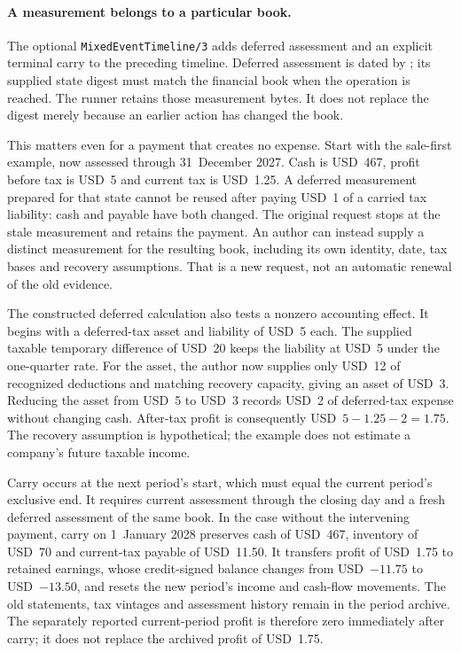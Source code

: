 \paragraph{A measurement belongs to a particular book.}
The optional \texttt{MixedEventTimeline/3} adds deferred assessment and an
explicit terminal carry to the preceding timeline. Deferred assessment is
dated by ; its supplied state digest must match the
financial book when the operation is reached. The runner retains those
measurement bytes. It does not replace the digest merely because an earlier
action has changed the book.

This matters even for a payment that creates no expense. Start with the
sale-first example, now assessed through 31~December 2027. Cash is USD~467,
profit before tax is USD~5 and current tax is USD~1.25. A deferred measurement
prepared for that state cannot be reused after paying USD~1 of a carried tax
liability: cash and payable have both changed. The original request stops at
the stale measurement and retains the payment. An author can instead supply
a distinct measurement for the resulting book, including its own identity,
date, tax bases and recovery assumptions. That is a new request, not an
automatic renewal of the old evidence.

The constructed deferred calculation also tests a nonzero accounting effect.
It begins with a deferred-tax asset and liability of USD~5 each. The supplied
taxable temporary difference of USD~20 keeps the liability at USD~5 under
the one-quarter rate. For the asset, the author now supplies only USD~12 of
recognized deductions and matching recovery capacity, giving an asset of
USD~3. Reducing the asset from USD~5 to USD~3 records USD~2 of deferred-tax
expense without changing cash. After-tax profit is consequently
USD~$5-1.25-2=1.75$. The recovery assumption is hypothetical; the example
does not estimate a company's future taxable income.

Carry occurs at the next period's start, which must equal the current period's
exclusive end. It requires current assessment through the closing day and a
fresh deferred assessment of the same book. In the case without the intervening
payment, carry on 1~January 2028 preserves cash of USD~467, inventory of USD~70
and current-tax payable of USD~11.50. It transfers profit of USD~1.75 to retained
earnings, whose credit-signed balance changes from USD~$-11.75$ to
USD~$-13.50$, and resets the new period's income and cash-flow movements.
The old statements, tax vintages and assessment history remain in the period
archive. The separately reported current-period profit is therefore zero
immediately after carry; it does not replace the archived profit of USD~1.75.


